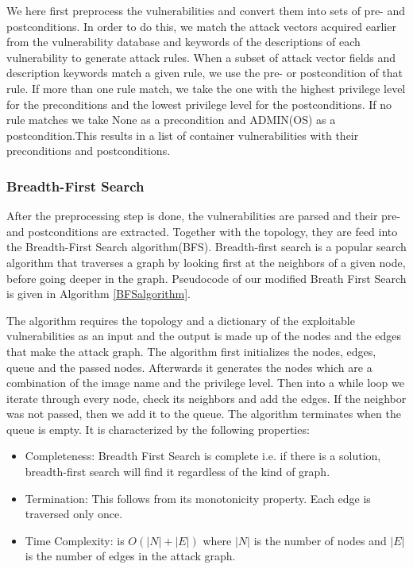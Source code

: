 \documentclass[letterpaper, 10 pt, conference]{ieeeconf}  %
\begin{document}
We here first preprocess the vulnerabilities and convert them into sets of pre- and postconditions. In order to do this, we match the attack vectors acquired earlier from the vulnerability database and keywords of the descriptions of each vulnerability to generate attack rules. When a subset of attack vector fields and description keywords match a given rule, we use the pre- or postcondition of that rule. If more than one rule match, we take the one with the highest privilege level for the preconditions and the lowest privilege level for the postconditions. If no rule matches we take None as a precondition and ADMIN(OS) as a postcondition.This results in a list of container vulnerabilities with their preconditions and postconditions.

\subsubsection{Breadth-First Search}

After the preprocessing step is done, the vulnerabilities are parsed and their pre- and postconditions are extracted. Together with the topology, they are feed into the Breadth-First Search algorithm(BFS).
Breadth-first search is a popular search algorithm that traverses a graph by looking first at the neighbors of a given node, before going deeper in the graph. Pseudocode of our modified Breath First Search is given in Algorithm \ref{BFSalgorithm}. 

The algorithm requires the topology and a dictionary of the exploitable vulnerabilities as an input and the output is made up of the nodes and the edges that make the attack graph. 
The algorithm first initializes the nodes, edges, queue and the passed nodes. Afterwards it generates the nodes which are a combination of the image name and the privilege level.
Then into a while loop we iterate through every node, check its neighbors and add the edges. If the neighbor was not passed, then we add it to the queue. The algorithm terminates when the queue is empty. It is characterized by the following properties:

\begin{itemize}
 \item Completeness: Breadth First Search is complete i.e. if there is a solution, breadth-first search will find it regardless of the kind of graph.
 \item Termination: This follows from its monotonicity property. Each edge is traversed only once.
 \item Time Complexity: is $O(|N| + |E|)$ where $|N|$ is the number of nodes and $|E|$ is the number of edges in the attack graph.
\end{itemize}
\end{document}
